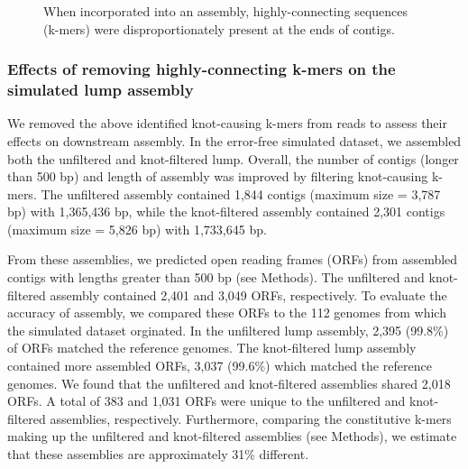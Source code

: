 \documentclass[11pt]{article} %
\begin{document}
\begin{figure}
\caption{When incorporated into an assembly, highly-connecting sequences (k-mers) were disproportionately present at the ends of contigs.}
\end{figure}

\subsubsection{Effects of removing highly-connecting k-mers on the simulated lump assembly}
We removed the above identified knot-causing k-mers from reads to assess their effects on downstream assembly.  In the error-free simulated dataset, we assembled both the unfiltered and knot-filtered lump.  Overall, the number of contigs (longer than 500 bp) and length of assembly was improved by filtering knot-causing k-mers.  The unfiltered assembly contained 1,844 contigs (maximum size = 3,787 bp) with 1,365,436 bp, while the knot-filtered assembly contained 2,301 contigs (maximum size = 5,826 bp) with 1,733,645 bp.

From these assemblies, we predicted open reading frames (ORFs) from assembled contigs with lengths greater than 500 bp (see Methods).  The unfiltered and knot-filtered assembly contained 2,401 and 3,049 ORFs, respectively.  To evaluate the accuracy of assembly, we compared these ORFs to the 112 genomes from which the simulated dataset orginated.  In the unfiltered lump assembly, 2,395 (99.8\%) of ORFs matched the reference genomes.  The knot-filtered lump assembly contained more assembled ORFs, 3,037 (99.6\%) which matched the reference genomes.  We found that the unfiltered and knot-filtered assemblies shared 2,018 ORFs.  A total of 383 and 1,031 ORFs were unique to the unfiltered and knot-filtered assemblies, respectively.   
Furthermore, comparing the constitutive k-mers making up the unfiltered and knot-filtered assemblies (see Methods), we estimate that these assemblies are approximately 31\% different.  
\end{document}
